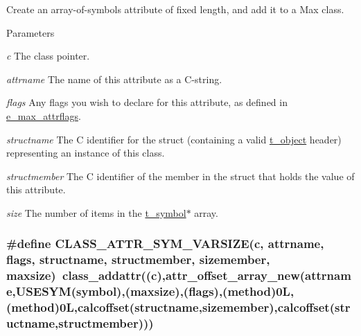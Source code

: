 Create an array-\/of-\/symbols attribute of fixed length, and add it to a Max class. 
\begin{DoxyParams}{Parameters}
\item[{\em c}]The class pointer. \item[{\em attrname}]The name of this attribute as a C-\/string. \item[{\em flags}]Any flags you wish to declare for this attribute, as defined in \hyperlink{group__attr_gaf296cfc6741bb19207f6ed8062809115}{e\_\-max\_\-attrflags}. \item[{\em structname}]The C identifier for the struct (containing a valid \hyperlink{structt__object}{t\_\-object} header) representing an instance of this class. \item[{\em structmember}]The C identifier of the member in the struct that holds the value of this attribute. \item[{\em size}]The number of items in the \hyperlink{structt__symbol}{t\_\-symbol}$\ast$ array. \end{DoxyParams}
\hypertarget{group__attr_ga610d6e9410b9c668e4df3ec2bf75f114}{
\subsubsection[{CLASS\_\-ATTR\_\-SYM\_\-VARSIZE}]{\setlength{\rightskip}{0pt plus 5cm}\#define CLASS\_\-ATTR\_\-SYM\_\-VARSIZE(c, \/  attrname, \/  flags, \/  structname, \/  structmember, \/  sizemember, \/  maxsize)~class\_\-addattr((c),attr\_\-offset\_\-array\_\-new(attrname,USESYM(symbol),(maxsize),(flags),({\bf method})0L,(method)0L,calcoffset(structname,sizemember),calcoffset(structname,structmember)))}}
\label{group__attr_ga610d6e9410b9c668e4df3ec2bf75f114}


